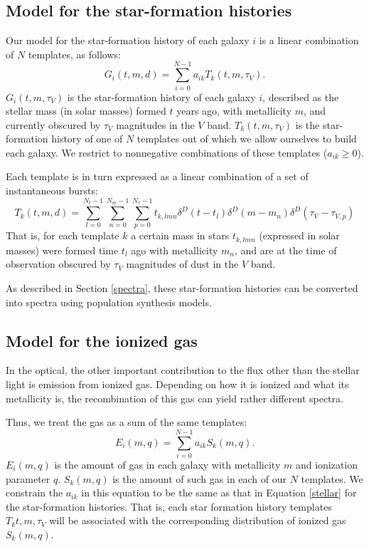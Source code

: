 \documentclass[10pt,preprint]{aastex}
\begin{document}
\subsection{Model for the star-formation histories}
\label{model}

Our model for the star-formation history of each galaxy $i$ is a linear
combination of $N$ templates, as follows:
\begin{equation}
\label{stellar}
G_i(t, m, d) = \sum_{i=0}^{N-1} a_{ik} T_k(t, m, \tau_V).
\end{equation}
$G_i(t, m, \tau_V)$ is the star-formation history of each galaxy $i$,
described as the stellar mass (in solar masses) formed $t$ years ago,
with metallicity $m$, and currently obscured by $\tau_V$ magnitudes in
the $V$ band. $T_k(t, m, \tau_V)$ is the star-formation history of one
of $N$ templates out of which we allow ourselves to build each
galaxy. We restrict to nonnegative combinations of these templates
($a_{ik} \ge 0$).

Each template is in turn expressed as a linear combination of a set of
instantaneous bursts:
\begin{equation}
T_k(t, m, d) = 
\sum_{l=0}^{N_t-1} 
\sum_{n=0}^{N_m-1} 
\sum_{p=0}^{N_\tau-1} 
t_{k,lmn} 
\delta^D(t-t_l)
\delta^D(m-m_n)
\delta^D(\tau_V-\tau_{V,p})
\end{equation}
That is, for each template $k$ a certain mass in stars $t_{k,lmn}$
(expressed in solar masses) were formed time $t_l$ ago with
metallicity $m_n$, and are at the time of observation obscured by
$\tau_V$ magnitudes of dust in the $V$ band.

As described in Section \ref{spectra}, these star-formation histories
can be converted into spectra using population synthesis models.

\subsection{Model for the ionized gas}

In the optical, the other important contribution to the flux other
than the stellar light is emission from ionized gas. Depending on how
it is ionized and what its metallicity is, the recombination of this
gas can yield rather different spectra. 

Thus, we treat the gas as a sum of the same templates:
\begin{equation}
\label{emission}
E_i(m, q) = \sum_{i=0}^{N-1} a_{ik} S_k(m, q). 
\end{equation}
$E_i(m, q)$ is the amount of gas in each galaxy with metallicity $m$
and ionization parameter $q$.  $S_k(m, q)$ is the amount of such gas
in each of our $N$ templates.  We constrain the $a_{ik}$ in this
equation to be the same as that in Equation \ref{stellar} for the
star-formation histories. That is, each star formation history
templates $T_k{t, m, \tau_V}$ will be associated with the
corresponding distribution of ionized gas $S_k(m,q)$. 
\end{document}
